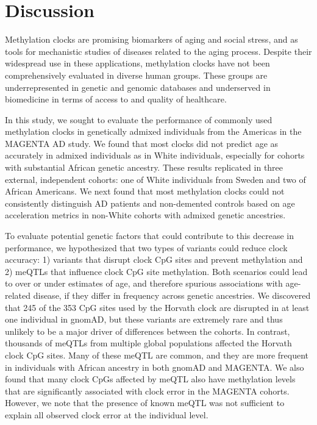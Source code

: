 \section{Discussion}

\noindent Methylation clocks are promising biomarkers of aging and social stress, and as tools for mechanistic studies of diseases related to the aging process. Despite their widespread use in these applications, methylation clocks have not been comprehensively evaluated in diverse human groups. These groups are underrepresented in genetic and genomic databases and underserved in biomedicine in terms of access to and quality of healthcare. 

In this study, we sought to evaluate the performance of commonly used methylation clocks in genetically admixed individuals from the Americas in the MAGENTA AD study. We found that most clocks did not predict age as accurately in admixed individuals as in White individuals, especially for cohorts with substantial African genetic ancestry. These results replicated in three external, independent cohorts: one of White individuals from Sweden and two of African Americans. We next found that most methylation clocks could not consistently distinguish AD patients and non-demented controls based on age acceleration metrics in non-White cohorts with admixed genetic ancestries.

To evaluate potential genetic factors that could contribute to this decrease in performance, we hypothesized that two types of variants could reduce clock accuracy: 1) variants that disrupt clock CpG sites and prevent methylation and 2) meQTLs that influence clock CpG site methylation. Both scenarios could lead to over or under estimates of age, and therefore spurious associations with age-related disease, if they differ in frequency across genetic ancestries. We discovered that 245 of the 353 CpG sites used by the Horvath clock are disrupted in at least one individual in gnomAD, but these variants are extremely rare and thus unlikely to be a major driver of differences between the cohorts. In contrast, thousands of meQTLs from multiple global populations affected the Horvath clock CpG sites. Many of these meQTL are common, and they are more frequent in individuals with African ancestry in both gnomAD and MAGENTA. We also found that many clock CpGs affected by meQTL also have methylation levels that are significantly associated with clock error in the MAGENTA cohorts. However, we note that the presence of known meQTL was not sufficient to explain all observed clock error at the individual level.

